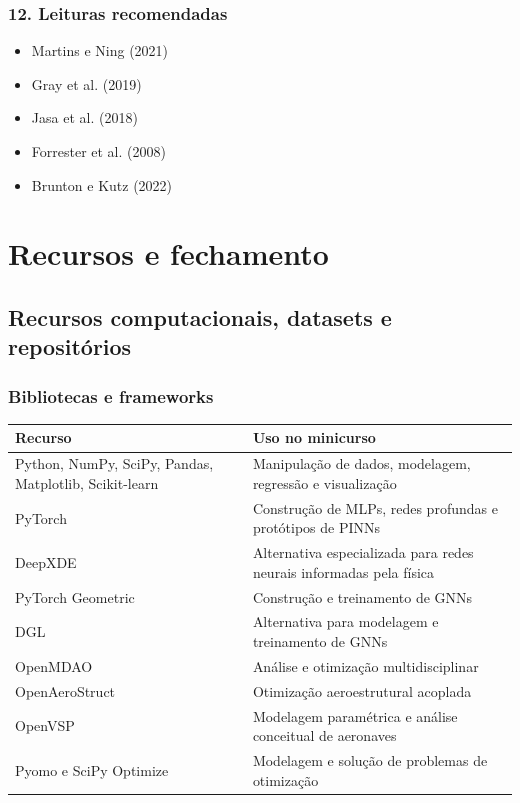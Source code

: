 \documentclass[
  brazilian,
  a4paper,
  DIV=11,
  numbers=noendperiod]{scrreprt}
\newcounter{none} %
\providecommand{\tightlist}{%
  \setlength{\itemsep}{0pt}\setlength{\parskip}{0pt}}
\begin{document}
\section{12. Leituras recomendadas}\label{leituras-recomendadas-3}

\begin{itemize}
\tightlist
\item
  Martins e Ning (2021)
\item
  Gray et al. (2019)
\item
  Jasa et al. (2018)
\item
  Forrester et al. (2008)
\item
  Brunton e Kutz (2022)
\end{itemize}

\part{Recursos e fechamento}

\chapter{Recursos computacionais, datasets e
repositórios}\label{recursos-computacionais-datasets-e-reposituxf3rios}

\section{Bibliotecas e frameworks}\label{bibliotecas-e-frameworks}

{\def\LTcaptype{none} %
\begin{longtable}[]{@{}
  >{\raggedright\arraybackslash}p{}
  >{\raggedright\arraybackslash}p{}@{}}
\toprule\noalign{}
\begin{minipage}[b]{\linewidth}\raggedright
Recurso
\end{minipage} & \begin{minipage}[b]{\linewidth}\raggedright
Uso no minicurso
\end{minipage} \\
\midrule\noalign{}
\endhead
\bottomrule\noalign{}
\endlastfoot
Python, NumPy, SciPy, Pandas, Matplotlib, Scikit-learn & Manipulação de
dados, modelagem, regressão e visualização \\
PyTorch & Construção de MLPs, redes profundas e protótipos de PINNs \\
DeepXDE & Alternativa especializada para redes neurais informadas pela
física \\
PyTorch Geometric & Construção e treinamento de GNNs \\
DGL & Alternativa para modelagem e treinamento de GNNs \\
OpenMDAO & Análise e otimização multidisciplinar \\
OpenAeroStruct & Otimização aeroestrutural acoplada \\
OpenVSP & Modelagem paramétrica e análise conceitual de aeronaves \\
Pyomo e SciPy Optimize & Modelagem e solução de problemas de
otimização \\
\end{longtable}
}
\end{document}
